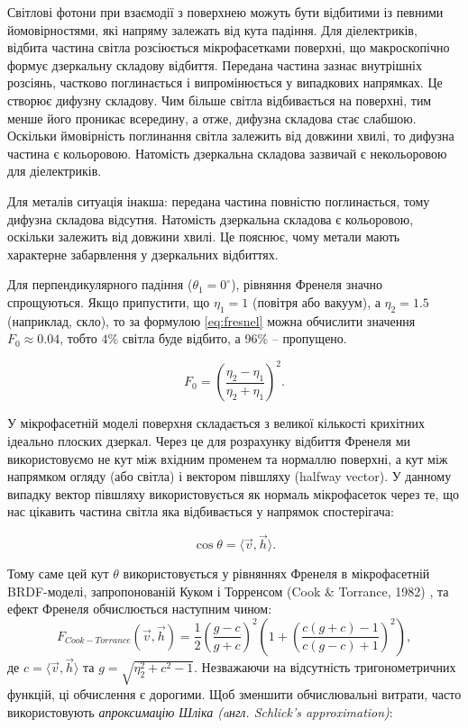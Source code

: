 \par 
Світлові фотони при взаємодії з поверхнею можуть бути відбитими із певними йомовірностями, які напряму залежать від кута падіння. Для діе\-ле\-кт\-ри\-ків, відбита частина світла розсіюється мікрофасетками поверхні, що мак\-ро\-ско\-піч\-но формує дзеркальну складову відбиття. Передана частина зазнає внут\-ріш\-ніх 
 розсіянь, частково поглинається і випромінюється у випадкових напрямках. Це створює дифузну складову.
Чим більше світла відбивається на поверхні, тим менше його проникає всередину, а отже, дифузна складова стає слабшою. Оскільки ймовірність поглинання світла 
залежить від довжини хвилі, то дифузна частина є кольоровою. Натомість дзеркальна складова зазвичай є некольоровою для діелектриків.


\par
Для металів ситуація інакша: передана частина повністю поглинається, тому дифузна складова відсутня. Натомість дзеркальна складова є кольоровою, оскільки залежить
 від довжини хвилі. Це пояснює, чому метали мають ха\-рак\-тер\-не забарвлення у дзеркальних відбиттях.

 \par
Для перпендикулярного падіння ($\theta_1 = 0^\circ$), рівняння Френеля значно спрощуються. Якщо припустити, що $\eta_1 = 1$ (повітря або вакуум), а $\eta_2 = 1.5$ 
(наприклад, скло), то за формулою \ref{eq:fresnel} можна обчислити значення $F_0 \approx 0.04$, тобто $4\%$ світла буде відбито, а 96\% -- пропущено.

\begin{equation*}
    F_0 = \left( \frac{\eta_2 - \eta_1}{\eta_2 + \eta_1} \right)^2.
\end{equation*}

\par 
У мікрофасетній моделі поверхня складається з великої кількості кри\-хіт\-них ідеально плоских дзеркал. Через це для розрахунку відбиття Френеля ми використовуємо не кут між 
вхідним променем та нормаллю поверхні, а кут між напрямком огляду (або світла) і вектором півшляху (halfway vector). У данному випадку
вектор півшляху використовується як нормаль мікрофасеток через те, що нас цікавить частина світла яка відбивається у напрямок спостерігача:

\begin{equation}
    \cos \theta = \langle\vec{v}, \vec{h}\rangle.
\end{equation}

Тому саме цей кут $\theta$ використовується у рівняннях Френеля в мікрофасетній BRDF-моделі, запропонованій Куком і Торренсом (Cook \& Torrance, 1982) \cite{cook1982reflectance}, та
ефект Френеля обчислюється наступним чином:
\begin{equation}
  F_{Cook-Torrance}(\vec{v},\vec{h}) = \frac{1}{2}(\frac{g - c}{g + c})^2(1 + (\frac{c(g+c)-1}{c(g-c)+1})^2),
\end{equation}
де $c = \langle\vec{v},\vec{h}\rangle$ та $g = \sqrt{\eta_2^2+c^2-1}$.
Незважаючи на відсутність тригонометричних функцій, ці обчислення є дорогими. Щоб зменшити обчислювальні витрати, часто використовують \textit{апроксимацію 
Шліка (aнгл. Schlick's approximation)}:

